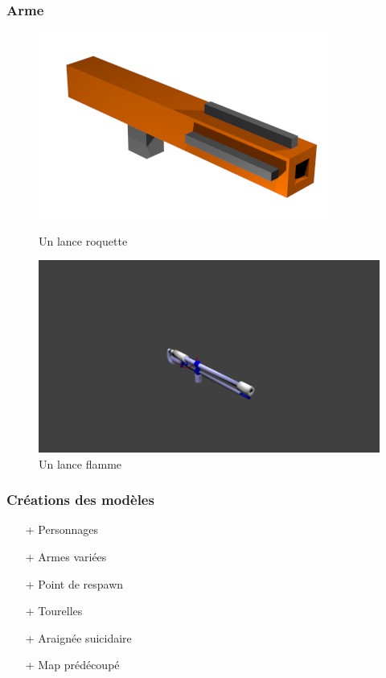 ﻿\documentclass{article}
\begin{document}
\subsubsection{Arme}

\begin{figure}[h]
\centerline{\includegraphics[scale=0.5]{rocket_launcher.png}}
\caption{Un lance roquette}
\centerline{\includegraphics[scale=0.5]{ff.png}}
\caption{Un lance flamme}
\end{figure}

\subsubsection{Créations des modèles}
\begin{itemize}
\item[+] Personnages
\item[+] Armes variées
\item[+] Point de respawn
\item[+] Tourelles
\item[+] Araignée suicidaire
\item[+] Map prédécoupé
\end{itemize}
\end{document}
